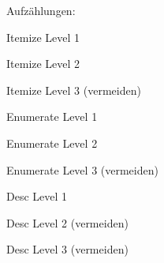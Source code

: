 Aufzählungen:

\begin{compactitem}
    \item Itemize Level 1
    \begin{compactitem}
        \item Itemize Level 2
        \begin{compactitem}
            \item Itemize Level 3 (vermeiden)
        \end{compactitem}
    \end{compactitem}
\end{compactitem}

\begin{compactenum}
    \item Enumerate Level 1
    \begin{compactenum}
        \item Enumerate Level 2
        \begin{compactenum}
            \item Enumerate Level 3 (vermeiden)
        \end{compactenum}
    \end{compactenum}
\end{compactenum}

\begin{compactdesc}
    \item[Desc] Level 1
    \begin{compactdesc}
        \item[Desc] Level 2 (vermeiden)
        \begin{compactdesc}
            \item[Desc] Level 3 (vermeiden)
        \end{compactdesc}
    \end{compactdesc}
\end{compactdesc}